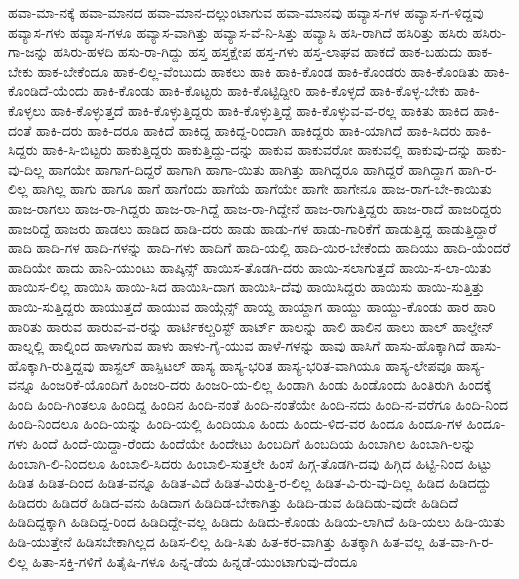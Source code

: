 {ಹವಾ-ಮಾ-ನಕ್ಕೆ
ಹವಾ-ಮಾನದ
ಹವಾ-ಮಾನ-ದಲ್ಲುಂಟಾಗುವ
ಹವಾ-ಮಾನವು
ಹವ್ಯಾಸ-ಗಳ
ಹವ್ಯಾಸ-ಗ-ಳಿದ್ದವು
ಹವ್ಯಾಸ-ಗಳು
ಹವ್ಯಾಸ-ಗಳೂ
ಹವ್ಯಾಸ-ವಾಗಿತ್ತು
ಹವ್ಯಾಸ-ವೆ-ನಿ-ಸಿತ್ತು
ಹವ್ಯಾಸಿ
ಹಸಿ-ರಾಗಿದೆ
ಹಸಿರಿತ್ತು
ಹಸಿರು
ಹಸಿರು-ಗಾ-ಜನ್ನು
ಹಸಿರು-ಹಳದಿ
ಹಸು-ರಾ-ಗಿದ್ದು
ಹಸ್ತ
ಹಸ್ತಕ್ಷೇಪ
ಹಸ್ತ-ಗಳು
ಹಸ್ತ-ಲಾಘವ
ಹಾಕದೆ
ಹಾಕ-ಬಹುದು
ಹಾಕ-ಬೇಕು
ಹಾಕ-ಬೇಕೆಂದೂ
ಹಾಕ-ಲಿಲ್ಲ-ವೆಂಬುದು
ಹಾಕಲು
ಹಾಕಿ
ಹಾಕಿ-ಕೊಂಡ
ಹಾಕಿ-ಕೊಂಡರು
ಹಾಕಿ-ಕೊಂಡಿತು
ಹಾಕಿ-ಕೊಂಡಿದೆ-ಯೆಂದು
ಹಾಕಿ-ಕೊಂಡು
ಹಾಕಿ-ಕೊಟ್ಟರು
ಹಾಕಿ-ಕೊಟ್ಟಿದ್ದೀರಿ
ಹಾಕಿ-ಕೊಳ್ಳದೆ
ಹಾಕಿ-ಕೊಳ್ಳ-ಬೇಕು
ಹಾಕಿ-ಕೊಳ್ಳಲು
ಹಾಕಿ-ಕೊಳ್ಳುತ್ತದೆ
ಹಾಕಿ-ಕೊಳ್ಳುತ್ತಿದ್ದರು
ಹಾಕಿ-ಕೊಳ್ಳುತ್ತಿದ್ದೆ
ಹಾಕಿ-ಕೊಳ್ಳುವ-ವ-ರಲ್ಲ
ಹಾಕಿತು
ಹಾಕಿದ
ಹಾಕಿ-ದಂತೆ
ಹಾಕಿ-ದರು
ಹಾಕಿ-ದರೂ
ಹಾಕಿದೆ
ಹಾಕಿದ್ದ
ಹಾಕಿದ್ದ-ರಿಂದಾಗಿ
ಹಾಕಿದ್ದರು
ಹಾಕಿ-ಯಾಗಿದೆ
ಹಾಕಿ-ಸಿದರು
ಹಾಕಿ-ಸಿದ್ದರು
ಹಾಕಿ-ಸಿ-ಬಿಟ್ಟರು
ಹಾಕುತ್ತಿದ್ದರು
ಹಾಕುತ್ತಿದ್ದು-ದನ್ನು
ಹಾಕುವ
ಹಾಕುವರೋ
ಹಾಕುವಲ್ಲಿ
ಹಾಕುವು-ದನ್ನು
ಹಾಕು-ವು-ದಿಲ್ಲ
ಹಾಗಯೇ
ಹಾಗಾಗ-ದಿದ್ದರೆ
ಹಾಗಾಗಿ
ಹಾಗಾ-ಯಿತು
ಹಾಗಿತ್ತು
ಹಾಗಿದ್ದರೂ
ಹಾಗಿದ್ದರೆ
ಹಾಗಿದ್ದಾಗ
ಹಾಗಿ-ರ-ಲಿಲ್ಲ
ಹಾಗಿಲ್ಲ
ಹಾಗು
ಹಾಗೂ
ಹಾಗೆ
ಹಾಗೆಂದು
ಹಾಗೆಯೆ
ಹಾಗೆಯೇ
ಹಾಗೇ
ಹಾಗೇನೂ
ಹಾಜ-ರಾಗ-ಬೇ-ಕಾಯಿತು
ಹಾಜ-ರಾಗಲು
ಹಾಜ-ರಾ-ಗಿದ್ದರು
ಹಾಜ-ರಾ-ಗಿದ್ದೆ
ಹಾಜ-ರಾ-ಗಿದ್ದೇನೆ
ಹಾಜ-ರಾಗುತ್ತಿದ್ದರು
ಹಾಜ-ರಾದೆ
ಹಾಜರಿದ್ದರು
ಹಾಜರಿದ್ದೆ
ಹಾಜರು
ಹಾಡಲು
ಹಾಡಿದ
ಹಾಡಿ-ದರು
ಹಾಡು
ಹಾಡು-ಗಳ
ಹಾಡು-ಗಾರಿಕೆಗೆ
ಹಾಡುತ್ತಿದ್ದ
ಹಾಡುತ್ತಿದ್ದಾರೆ
ಹಾದಿ
ಹಾದಿ-ಗಳ
ಹಾದಿ-ಗಳನ್ನು
ಹಾದಿ-ಗಳು
ಹಾದಿಗೆ
ಹಾದಿ-ಯಲ್ಲಿ
ಹಾದಿ-ಯಿರ-ಬೇಕೆಂದು
ಹಾದಿಯು
ಹಾದಿ-ಯೆಂದರೆ
ಹಾದಿಯೇ
ಹಾದು
ಹಾನಿ-ಯುಂಟು
ಹಾಪ್ಕಿನ್ಸ್
ಹಾಯಿಸ-ತೊಡಗಿ-ದರು
ಹಾಯಿ-ಸಲಾಗುತ್ತದೆ
ಹಾಯಿ-ಸ-ಲಾ-ಯಿತು
ಹಾಯಿಸ-ಲಿಲ್ಲ
ಹಾಯಿಸಿ
ಹಾಯಿ-ಸಿದ
ಹಾಯಿಸಿ-ದಾಗ
ಹಾಯಿಸಿ-ದೆವು
ಹಾಯಿಸಿದ್ದರು
ಹಾಯಿಸು
ಹಾಯಿ-ಸುತ್ತಿತ್ತು
ಹಾಯಿ-ಸುತ್ತಿದ್ದರು
ಹಾಯುತ್ತದೆ
ಹಾಯುವ
ಹಾಯ್ಗೆನ್ಸ್
ಹಾಯ್ದ
ಹಾಯ್ದಾಗ
ಹಾಯ್ದು
ಹಾಯ್ದು-ಕೊಂಡು
ಹಾರ
ಹಾರಿ
ಹಾರಿತು
ಹಾರುವ
ಹಾರುವ-ವ-ರನ್ನು
ಹಾರ್ಟಿಕಲ್ಚರಿಸ್ಟ್
ಹಾರ್ಟ್
ಹಾಲನ್ನು
ಹಾಲಿ
ಹಾಲಿನ
ಹಾಲು
ಹಾಲ್
ಹಾಲ್ಡೇನ್
ಹಾಲ್ನಲ್ಲಿ
ಹಾಲ್ನಿಂದ
ಹಾಳಾಗುವ
ಹಾಳು
ಹಾಳು-ಗೈ-ಯುವ
ಹಾಳೆ-ಗಳನ್ನು
ಹಾವು
ಹಾಸಿಗೆ
ಹಾಸು-ಹೊಕ್ಕಾಗಿದೆ
ಹಾಸು-ಹೊಕ್ಕಾಗಿ-ರುತ್ತಿದ್ದವು
ಹಾಸ್ಟಲ್
ಹಾಸ್ಪಿಟಲ್
ಹಾಸ್ಯ
ಹಾಸ್ಯ-ಭರಿತ
ಹಾಸ್ಯ-ಭರಿತ-ವಾಗಿಯೂ
ಹಾಸ್ಯ-ಲೇಪವೂ
ಹಾಸ್ಯ-ವನ್ನೂ
ಹಿಂಜರಿಕೆ-ಯೊಂದಿಗೆ
ಹಿಂಜರಿ-ದರು
ಹಿಂಜರಿ-ಯ-ಲಿಲ್ಲ
ಹಿಂಡಾಗಿ
ಹಿಂಡು
ಹಿಂಡೊಂದು
ಹಿಂತಿರುಗಿ
ಹಿಂದಕ್ಕೆ
ಹಿಂದಿ
ಹಿಂದಿ-ಗಿಂತಲೂ
ಹಿಂದಿದ್ದ
ಹಿಂದಿನ
ಹಿಂದಿ-ನಂತೆ
ಹಿಂದಿ-ನಂತೆಯೇ
ಹಿಂದಿ-ನದು
ಹಿಂದಿ-ನ-ವರೆಗೂ
ಹಿಂದಿ-ನಿಂದ
ಹಿಂದಿ-ನಿಂದಲೂ
ಹಿಂದಿ-ಯನ್ನು
ಹಿಂದಿ-ಯಲ್ಲಿ
ಹಿಂದಿಯೂ
ಹಿಂದು
ಹಿಂದು-ಳಿದ-ವರ
ಹಿಂದೂ
ಹಿಂದೂ-ಗಳ
ಹಿಂದೂ-ಗಳು
ಹಿಂದೆ
ಹಿಂದೆ-ಯಿದ್ದಾ-ರೆಂದು
ಹಿಂದೆಯೇ
ಹಿಂದೇಟು
ಹಿಂಬದಿಗೆ
ಹಿಂಬದಿಯ
ಹಿಂಬಾಗಿಲ
ಹಿಂಬಾಗಿ-ಲನ್ನು
ಹಿಂಬಾಗಿ-ಲಿ-ನಿಂದಲೂ
ಹಿಂಬಾಲಿ-ಸಿದರು
ಹಿಂಬಾಲಿ-ಸುತ್ತಲೇ
ಹಿಂಸೆ
ಹಿಗ್ಗ-ತೊಡಗಿ-ದವು
ಹಿಗ್ಗಿದ
ಹಿಟ್ಟಿ-ನಿಂದ
ಹಿಟ್ಟು
ಹಿಡಿತ
ಹಿಡಿತ-ದಿಂದ
ಹಿಡಿತ-ವನ್ನೂ
ಹಿಡಿತ-ವಿದೆ
ಹಿಡಿತ-ವಿರುತ್ತಿ-ರ-ಲಿಲ್ಲ
ಹಿಡಿತ-ವಿ-ರು-ವು-ದಿಲ್ಲ
ಹಿಡಿದ
ಹಿಡಿದದ್ದು
ಹಿಡಿದರು
ಹಿಡಿದರೆ
ಹಿಡಿದ-ವನು
ಹಿಡಿದಾಗ
ಹಿಡಿದಿಡ-ಬೇಕಾಗಿತ್ತು
ಹಿಡಿದಿ-ಡುವ
ಹಿಡಿದಿಡು-ವುದೇ
ಹಿಡಿದಿದೆ
ಹಿಡಿದಿದ್ದಕ್ಕಾಗಿ
ಹಿಡಿದಿದ್ದ-ರಿಂದ
ಹಿಡಿದಿದ್ದೇ-ವಲ್ಲ
ಹಿಡಿದು
ಹಿಡಿದು-ಕೊಂಡು
ಹಿಡಿಯ-ಲಾಗಿದೆ
ಹಿಡಿ-ಯಲು
ಹಿಡಿ-ಯಿತು
ಹಿಡಿ-ಯುತ್ತೇನೆ
ಹಿಡಿಸಬೇಕಾಗಿಲ್ಲದ
ಹಿಡಿಸ-ಲಿಲ್ಲ
ಹಿಡಿ-ಸಿತು
ಹಿತ-ಕರ-ವಾಗಿತ್ತು
ಹಿತಕ್ಕಾಗಿ
ಹಿತ-ವಲ್ಲ
ಹಿತ-ವಾ-ಗಿ-ರ-ಲಿಲ್ಲ
ಹಿತಾ-ಸಕ್ತಿ-ಗಳಿಗೆ
ಹಿತೈಷಿ-ಗಳೂ
ಹಿನ್ನ-ಡೆಯ
ಹಿನ್ನಡೆ-ಯುಂಟಾಗುವು-ದೆಂದೂ
}
